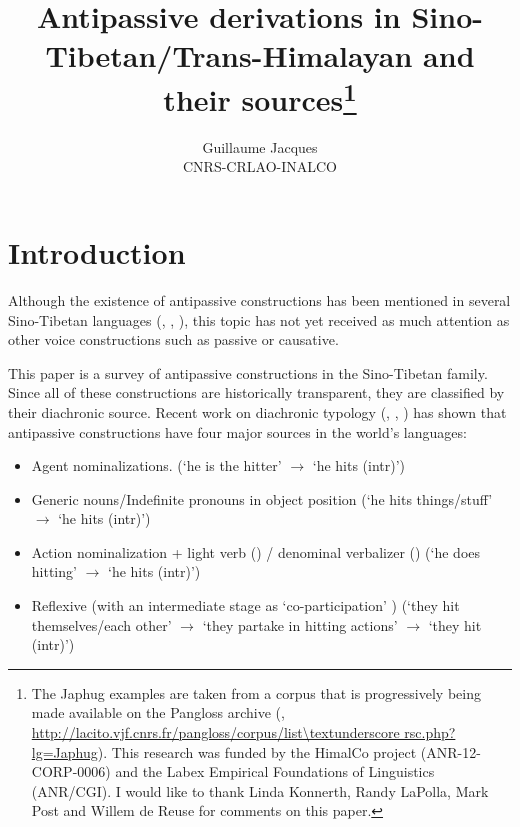 \documentclass[oneside,a4paper,11pt]{article}
\begin{document}
 
\title{Antipassive derivations in Sino-Tibetan/Trans-Himalayan and their sources\footnote{The Japhug examples are taken from a corpus that is progressively being made available on the Pangloss archive (\citealt{michailovsky14pangloss},  
 \url{http://lacito.vjf.cnrs.fr/pangloss/corpus/list\textunderscore rsc.php?lg=Japhug}). This research was funded by the HimalCo project (ANR-12-CORP-0006) and  the Labex Empirical Foundations of Linguistics (ANR/CGI). I would like to thank Linda Konnerth, Randy LaPolla, Mark Post and Willem de Reuse for comments on this paper.}}
\author{Guillaume Jacques\\ CNRS-CRLAO-INALCO}
\maketitle

\sloppy

\section*{Introduction}
Although the existence of antipassive constructions has been mentioned in several Sino-Tibetan languages (\citealt[225-7]{doornenbal09}, \citealt{jacques14antipassive}, \citealt{bickel15antipassive}), this topic has not yet received as much attention as other voice constructions such as passive or causative.

This paper is a survey of antipassive constructions in the Sino-Tibetan family. Since all of these constructions are historically transparent, they are classified by their diachronic source. Recent work on diachronic typology (\citealt[235]{janic.these},  \citealt{jacques14antipassive}, \citealt{sanso17antipassive}) has shown that antipassive constructions have four major sources in the world's languages:
\begin{itemize}
\item Agent nominalizations. (`he is the hitter' $\rightarrow$  `he hits (intr)')
\item Generic nouns/Indefinite pronouns in object position  (`he hits things/stuff' $\rightarrow$  `he hits (intr)')
\item Action nominalization + light verb (\citealt{creissels12antip}) / denominal verbalizer (\citealt{jacques14antipassive}) (`he does hitting' $\rightarrow$  `he hits (intr)')
\item Reflexive (with an intermediate stage as `co-participation' \citealt{creissels08coparticipation}) (`they hit themselves/each other' $\rightarrow$  `they partake in hitting actions' $\rightarrow$  `they hit (intr)')
\end{itemize}
\end{document}
